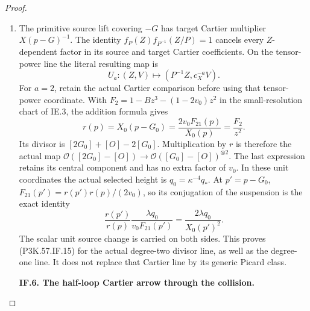 \begin{proof}
\begin{enumerate}[label=\arabic*.]
\item The primitive source lift covering \(-G\) has target
Cartier multiplier \(X(p-G)^{-1}\). The identity
\(f_P(Z)f_{P^{-1}}(Z/P)=1\) cancels every
\(Z\)-dependent factor in its source and target
Cartier coefficients. On the tensor-power line the
literal resulting map is
\[
          U_a:(Z,V)\longmapsto(P^{-1}Z,c_X^{-a}V).
                                                               \tag{P3K.57.IF.16d}
\]
For \(a=2\), retain the actual Cartier comparison
before using that tensor-power coordinate. With
\(F_2=1-Bz^3-(1-2v_0)z^2\) in the small-resolution
chart of IE.3, the addition formula gives
\[
 r(p)=X_0(p-G_0)=\frac{2v_0F_{21}(p)}{X_0(p)}
                         =\frac{F_2}{z^2}.             \tag{P3K.57.IF.16e}
\]
Its divisor is \([2G_0]+[O]-2[G_0]\). Multiplication
by \(r\) is therefore the actual map
\(\mathcal O([2G_0]-[O])\to
\mathcal O([G_0]-[O])^{\otimes2}\). The last
expression retains its central component and has no
extra factor of \(v_0\). In these unit coordinates the
actual selected height is \(q_0=\kappa^{-4}q_*\).
At \(p'=p-G_0\),
\(F_{21}(p')=r(p')r(p)/(2v_0)\), so its conjugation
of the suspension is the exact identity
\[
 \frac{r(p')}{r(p)}\frac{\lambda q_0}{v_0F_{21}(p')}
                   =\frac{2\lambda q_0}{X_0(p')^2}.
                                                               \tag{P3K.57.IF.16f}
\]
The scalar unit source change is carried on both sides.
This proves (P3K.57.IF.15) for the actual degree-two divisor
line, as well as the degree-one line. It does not
replace that Cartier line by its generic Picard class.

\par\medskip\noindent\textbf{IF.6. The half-loop Cartier arrow through the collision.}\par\nopagebreak[4]


\end{enumerate}
\end{proof}
